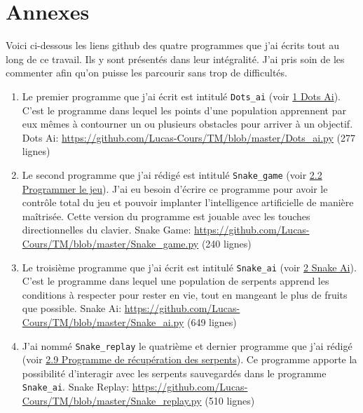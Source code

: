\documentclass[12pt, a4paper, openany]{book}
\begin{document}
\section*{Annexes}
Voici ci-dessous les liens \og{}github\fg{} des quatre programmes que j'ai écrits tout au long de ce travail. Ils y sont présentés dans leur intégralité. J'ai pris soin de les commenter afin qu'on puisse les parcourir sans trop de difficultés.
\begin{enumerate}
	\item Le premier programme que j'ai écrit est intitulé \verb'Dots_ai' (voir \hyperref[r:1]{1 Dots Ai}). C'est le programme dans lequel les points d'une population apprennent par eux mêmes à contourner un ou plusieurs obstacles pour arriver à un objectif.\newline
	Dots Ai: \url{https://github.com/Lucas-Cours/TM/blob/master/Dots_ai.py} (277 lignes)
	\item Le second programme que j'ai rédigé est intitulé \verb'Snake_game' (voir \hyperref[r:2.2]{2.2 Programmer le jeu}). J'ai eu besoin d'écrire ce programme pour avoir le contrôle total du jeu et pouvoir implanter l'intelligence artificielle de manière maîtrisée. Cette version du programme est jouable avec les touches directionnelles du clavier.\newline
	Snake Game: \url{https://github.com/Lucas-Cours/TM/blob/master/Snake_game.py} (240 lignes)
	\item Le troisième programme que j'ai écrit est intitulé \verb'Snake_ai' (voir \hyperref[r:2]{2 Snake Ai}). C'est le programme dans lequel une population de serpents apprend les conditions à respecter pour rester en vie, tout en \og{}mangeant\fg{} le plus de fruits que possible.\newline
	Snake Ai: \url{https://github.com/Lucas-Cours/TM/blob/master/Snake_ai.py} (649 lignes)
	\item J'ai nommé \verb'Snake_replay' le quatrième et dernier programme que j'ai rédigé (voir \hyperref[r:2.9]{2.9 Programme de récupération des serpents}). Ce programme apporte la possibilité d'interagir avec les serpents sauvegardés dans le programme \verb'Snake_ai'.\newline
	Snake Replay: \url{https://github.com/Lucas-Cours/TM/blob/master/Snake_replay.py} (510 lignes)
\end{enumerate}

\newpage
\pagestyle{plain}
\end{document}
